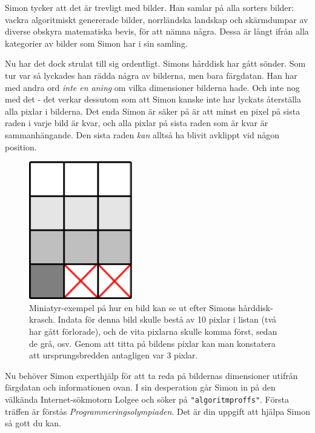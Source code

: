 
Simon tycker att det är trevligt med bilder. Han samlar på alla sorters bilder:
vackra algoritmiskt genererade bilder, norrländska landskap och skärmdumpar av
diverse obskyra matematiska bevis, för att nämna några. Dessa är långt ifrån
alla kategorier av bilder som Simon har i sin samling.

Nu har det dock strulat till sig ordentligt. Simons hårddisk har gått sönder.
Som tur var så lyckades han rädda några av bilderna, men bara färgdatan. Han
har med andra ord \emph{inte en aning} om vilka dimensioner bilderna hade. Och
inte nog med det - det verkar dessutom som att Simon kanske inte har lyckats
återställa alla pixlar i bilderna. Det enda Simon är säker på är att minst en
pixel på sista raden i varje bild är kvar, och alla pixlar på sista raden som
är kvar är sammanhängande. Den sista raden \emph{kan} alltså ha blivit avklippt
vid någon position.

\begin{figure}[ht!]
\centering
\includegraphics[width=0.4\textwidth]{example.png}
\caption{Miniatyr-exempel på hur en bild kan se ut efter Simons hårddisk-krasch. Indata
för denna bild skulle bestå av 10 pixlar i listan (två har gått förlorade), och de vita
pixlarna skulle komma först, sedan de grå, osv. Genom att titta på bildens pixlar kan
man konstatera att ursprungsbredden antagligen var 3 pixlar.}
\end{figure}

Nu behöver Simon experthjälp för att ta reda på bildernas dimensioner utifrån
färgdatan och informationen ovan. I sin desperation går Simon in på den
välkända Internet-sökmotorn Lolgee och söker på \texttt{"algoritmproffs"}.
Första träffen är förstås \emph{Programmeringsolympiaden}. Det är din uppgift
att hjälpa Simon så gott du kan.


